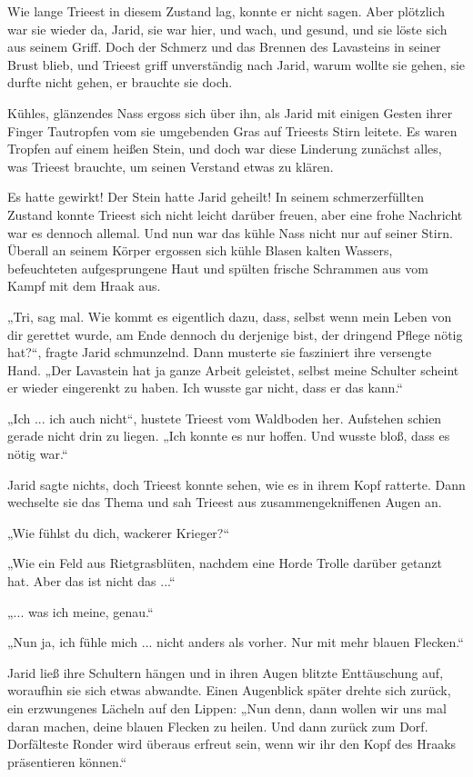 Wie lange Trieest in diesem Zustand lag, konnte er nicht sagen. Aber plötzlich war sie wieder da, Jarid, sie war hier, und wach, und gesund, und sie löste sich aus seinem Griff. Doch der Schmerz und das Brennen des Lavasteins in seiner Brust blieb, und Trieest griff unverständig nach Jarid, warum wollte sie gehen, sie durfte nicht gehen, er brauchte sie doch.

Kühles, glänzendes Nass ergoss sich über ihn, als Jarid mit einigen Gesten ihrer Finger Tautropfen vom sie umgebenden Gras auf Trieests Stirn leitete. Es waren Tropfen auf einem heißen Stein, und doch war diese Linderung zunächst alles, was Trieest brauchte, um seinen Verstand etwas zu klären.

Es hatte gewirkt! Der Stein hatte Jarid geheilt! In seinem schmerzerfüllten Zustand konnte Trieest sich nicht leicht darüber freuen, aber eine frohe Nachricht war es dennoch allemal. Und nun war das kühle Nass nicht nur auf seiner Stirn. Überall an seinem Körper ergossen sich kühle Blasen kalten Wassers, befeuchteten aufgesprungene Haut und spülten frische Schrammen aus vom Kampf mit dem Hraak aus.

„Tri, sag mal. Wie kommt es eigentlich dazu, dass, selbst wenn mein Leben von dir gerettet wurde, am Ende dennoch du derjenige bist, der dringend Pflege nötig hat?“, fragte Jarid schmunzelnd. Dann musterte sie fasziniert ihre versengte Hand. „Der Lavastein hat ja ganze Arbeit geleistet, selbst meine Schulter scheint er wieder eingerenkt zu haben. Ich wusste gar nicht, dass er das kann.“

„Ich ... ich auch nicht“, hustete Trieest vom Waldboden her. Aufstehen schien gerade nicht drin zu liegen. „Ich konnte es nur hoffen. Und wusste bloß, dass es nötig war.“

Jarid sagte nichts, doch Trieest konnte sehen, wie es in ihrem Kopf ratterte. Dann wechselte sie das Thema und sah Trieest aus zusammengekniffenen Augen an.

„Wie fühlst du dich, wackerer Krieger?“

„Wie ein Feld aus Rietgrasblüten, nachdem eine Horde Trolle darüber getanzt hat. Aber das ist nicht das ...“

„... was ich meine, genau.“

„Nun ja, ich fühle mich ... nicht anders als vorher. Nur mit mehr blauen Flecken.“

Jarid ließ ihre Schultern hängen und in ihren Augen blitzte Enttäuschung auf, woraufhin sie sich etwas abwandte. Einen Augenblick später drehte sich zurück, ein erzwungenes Lächeln auf den Lippen: „Nun denn, dann wollen wir uns mal daran machen, deine blauen Flecken zu heilen. Und dann zurück zum Dorf. Dorfälteste Ronder wird überaus erfreut sein, wenn wir ihr den Kopf des Hraaks präsentieren können.“

